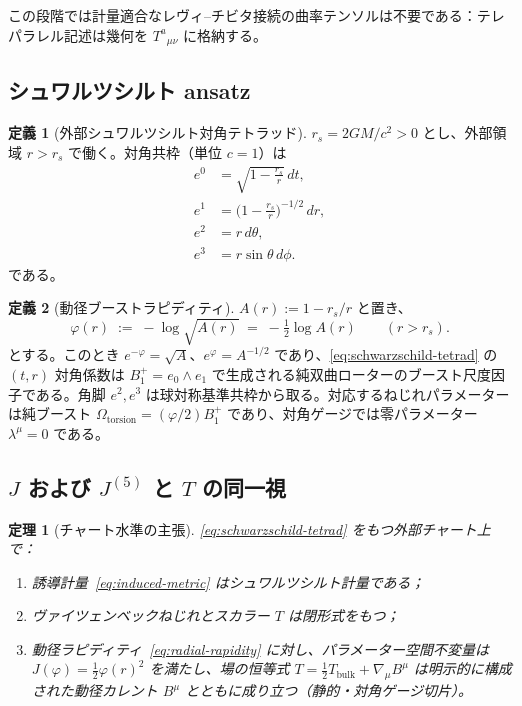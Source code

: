 \documentclass[dvipdfmx,11pt,a4paper]{article}
\theoremstyle{definition}
\newtheorem{definition}{定義}
\theoremstyle{plain}
\newtheorem{theorem}{定理}
\theoremstyle{remark}
\begin{document}
この段階では計量適合なレヴィ--チビタ接続の曲率テンソルは不要である：テレパラレル記述は幾何を $T^{a}{}_{\mu\nu}$ に格納する。

\subsection{シュワルツシルト ansatz}

\begin{definition}[外部シュワルツシルト対角テトラッド]
$r_{s}=2GM/c^{2}>0$ とし、外部領域 $r>r_{s}$ で働く。対角共枠（単位 $c=1$）は
\begin{align}
e^{0} &= \sqrt{1-\frac{r_{s}}{r}}\,dt,\nonumber\\
e^{1} &= \bigl(1-\frac{r_{s}}{r}\bigr)^{-1/2}\,dr,\nonumber\\
e^{2} &= r\,d\theta,\nonumber\\
e^{3} &= r\sin\theta\,d\phi.
\label{eq:schwarzschild-tetrad}
\end{align}
である。
\end{definition}

\begin{definition}[動径ブーストラピディティ]
$A(r):=1-r_{s}/r$ と置き、
\begin{equation}
\varphi(r) \;:=\; -\log\sqrt{A(r)} \;=\; -\tfrac12\log A(r)
\qquad(r>r_{s}).
\label{eq:radial-rapidity}
\end{equation}
とする。このとき $e^{-\varphi}=\sqrt{A}$、$e^{\varphi}=A^{-1/2}$ であり、\eqref{eq:schwarzschild-tetrad} の $(t,r)$ 対角係数は $B^{+}_{1}=e_{0}\wedge e_{1}$ で生成される純双曲ローターのブースト尺度因子である。角脚 $e^{2},e^{3}$ は球対称基準共枠から取る。対応するねじれパラメーターは純ブースト $\Omega_{\mathrm{torsion}}=(\varphi/2)B^{+}_{1}$ であり、対角ゲージでは零パラメーター $\lambda^{\mu}=0$ である。
\end{definition}

\subsection{$J$ および $J^{(5)}$ と $T$ の同一視}

\begin{theorem}[チャート水準の主張]
\eqref{eq:schwarzschild-tetrad} をもつ外部チャート上で：
\begin{enumerate}
\item 誘導計量~\eqref{eq:induced-metric} はシュワルツシルト計量である；
\item ヴァイツェンベックねじれとスカラー $T$ は閉形式をもつ；
\item 動径ラピディティ~\eqref{eq:radial-rapidity} に対し、パラメーター空間不変量は
$J(\varphi)=\tfrac12\varphi(r)^{2}$ を満たし、場の恒等式
$T=\tfrac12 T_{\mathrm{bulk}}+ \nabla_{\mu}B^{\mu}$
は明示的に構成された動径カレント $B^{\mu}$ とともに成り立つ（静的・対角ゲージ切片）。
\end{enumerate}
\end{theorem}
\end{document}
